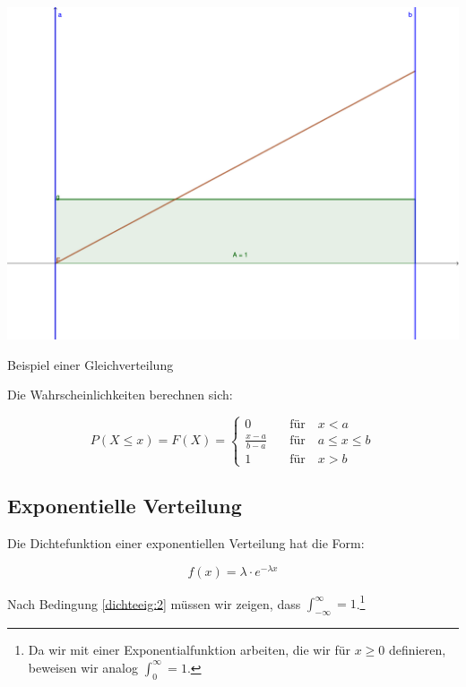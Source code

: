 \documentclass{tufte-handout}
\theoremstyle{own}
\begin{document}
\begin{marginfigure}
	\includegraphics{gleichverteilung}
	\caption{Beispiel einer Gleichverteilung}
\end{marginfigure}

Die Wahrscheinlichkeiten berechnen sich:

\begin{equation}
P(X\leq x) = F(X) = \begin{cases}
0 \hspace{1em} & \text{für}  \hspace{1em} x < a \\
\frac{x-a}{b-a} \hspace{1em} & \text{für}  \hspace{1em} a \leq x \leq b \\
1 \hspace{1em} & \text{für}  \hspace{1em} x > b
\end{cases}
\end{equation}

\subsection{Exponentielle Verteilung}

Die Dichtefunktion einer exponentiellen Verteilung hat die Form:

\begin{equation}
	f(x) = \lambda \cdot e^{-\lambda x}
\end{equation}

Nach Bedingung \eqref{dichteeig:2} müssen wir zeigen, dass
$\int_{-\infty}^\infty = 1$.\footnote{Da wir mit einer Exponentialfunktion arbeiten, die wir für $x\geq0$ definieren, beweisen wir analog $\int_0^\infty = 1$.}
\end{document}
